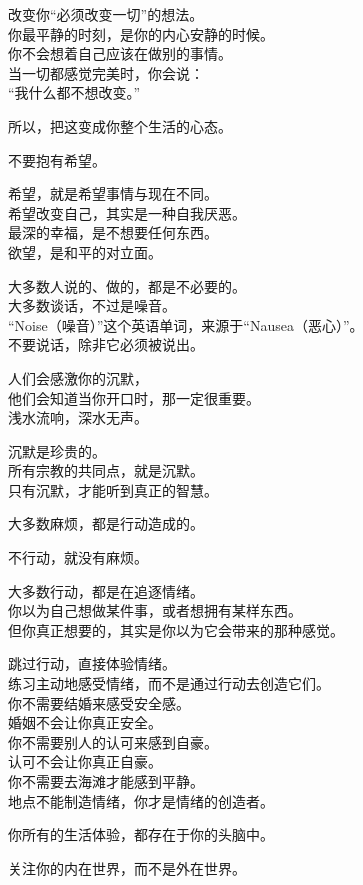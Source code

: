 \documentclass[
]{article}
\begin{document}
改变你``必须改变一切''的想法。\\
你最平静的时刻，是你的内心安静的时候。\\
你不会想着自己应该在做别的事情。\\
当一切都感觉完美时，你会说：\\
``我什么都不想改变。''

所以，把这变成你整个生活的心态。

不要抱有希望。

希望，就是希望事情与现在不同。\\
希望改变自己，其实是一种自我厌恶。\\
最深的幸福，是不想要任何东西。\\
欲望，是和平的对立面。

大多数人说的、做的，都是不必要的。\\
大多数谈话，不过是噪音。\\
``Noise（噪音）''这个英语单词，来源于``Nausea（恶心）''。\\
不要说话，除非它必须被说出。

人们会感激你的沉默，\\
他们会知道当你开口时，那一定很重要。\\
浅水流响，深水无声。

沉默是珍贵的。\\
所有宗教的共同点，就是沉默。\\
只有沉默，才能听到真正的智慧。

大多数麻烦，都是行动造成的。

不行动，就没有麻烦。

大多数行动，都是在追逐情绪。\\
你以为自己想做某件事，或者想拥有某样东西。\\
但你真正想要的，其实是你以为它会带来的那种感觉。

跳过行动，直接体验情绪。\\
练习主动地感受情绪，而不是通过行动去创造它们。\\
你不需要结婚来感受安全感。\\
婚姻不会让你真正安全。\\
你不需要别人的认可来感到自豪。\\
认可不会让你真正自豪。\\
你不需要去海滩才能感到平静。\\
地点不能制造情绪，你才是情绪的创造者。

你所有的生活体验，都存在于你的头脑中。

关注你的内在世界，而不是外在世界。
\end{document}
